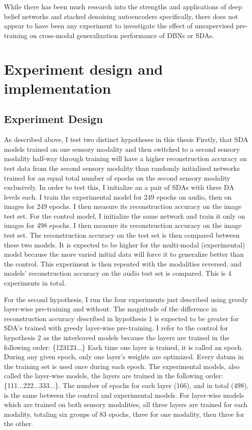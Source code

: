 \documentclass[12pt]{article}
\begin{document}
\begin{doublespacing}
While there has been much research into the strengths and applications of deep belief networks and stacked denoising autoencoders specifically, there does not appear to have been any experiment to investigate the effect of unsupervised pre-training on cross-modal generalization performance of DBNs or SDAs.

	
\section{Experiment design and implementation}

	\subsection{Experiment Design}
	As described above, I test two distinct hypotheses in this thesis Firstly, that SDA models trained on one sensory modality and then switched to a second sensory modality half-way through training will have a higher reconstruction accuracy on test data from the second sensory modality than randomly initialized networks trained for an equal total number of epochs on the second sensory modality exclusively. In order to test this, I initialize an a pair of SDAs with three DA levels each. I train the experimental model for 249 epochs on audio, then on images for 249 epochs. I then measure its reconstruction accuracy on the image test set. For the control model, I initialize the same network and train it only on images for 498 epochs. I then measure its reconstruction accuracy on the image test set. The reconstruction accuracy on the test set is then compared between these two models. It is expected to be higher for the multi-modal (experimental) model because the more varied initial data will force it to generalize better than the control. This experiment is then repeated with the modalities reversed, and models' reconstruction accuracy on the audio test set is compared. This is 4 experiments in total. 
	
	For the second hypothesis, I run the four experiments just described using greedy layer-wise pre-training and without. The magnitude of the difference in reconstruction accuracy described in hypothesis 1 is expected to be greater for SDA's trained with greedy layer-wise pre-training. I refer to the control for hypothesis 2 as the interleaved models because the layers are trained in the following order: \{123123...\} Each time one layer is trained, it is called an epoch. During any given epoch, only one layer's weights are optimized. Every datum in the training set is used once during each epoch. The experimental models, also called the layer-wise models, the layers are trained in the following order: \{111...222...333...\}. The number of epochs for each layer (166), and in total (498), is the same between the control and experimental models. For layer-wise models which are trained on both sensory modalities, all three layers are trained for each modality, totaling six groups of 83 epochs, three for one modality, then three for the other.
	

\end{doublespacing}
\end{document}
